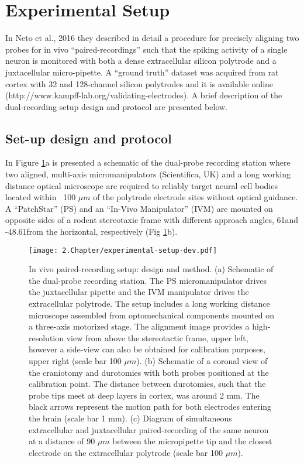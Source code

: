 
\section{Experimental Setup}
\label{sec:exp-setup}
In Neto et al., 2016 they described in detail a procedure for precisely aligning two probes for in vivo “paired-recordings” such that the spiking activity of a single neuron is monitored with both a dense extracellular silicon polytrode and a juxtacellular micro-pipette. A “ground truth” dataset was acquired from rat cortex with 32 and 128-channel silicon polytrodes and it is available online (http://www.kampff-lab.org/validating-electrodes). A brief description of the dual-recording setup design and protocol are presented below. 

\subsection{Set-up design and protocol}
\label{subsec:setup-and-protocol}
In Figure \ref{fig:experimental-aparatus}a is presented a schematic of the dual-probe recording station where two aligned, multi-axis micromanipulators (Scientifica, UK) and a long working distance optical microscope are required to reliably target neural cell bodies located within ~100 $\mu m$ of the polytrode electrode sites without optical guidance. A “PatchStar” (PS) and an “In-Vivo Manipulator” (IVM) are mounted on opposite sides of a rodent stereotaxic frame with different approach angles, 61\degree  and -48.61\degree  from the horizontal, respectively (Fig \ref{fig:experimental-aparatus}b). 

\begin{figure}[!h]
	\centering
	\texttt{[image: 2.Chapter/experimental-setup-dev.pdf]}
	\caption{In vivo paired-recording setup: design and method.
(a) Schematic of the dual-probe recording station. The PS micromanipulator drives the juxtacellular pipette and the IVM manipulator drives the extracellular polytrode. The setup includes a long working distance microscope assembled from optomechanical components mounted on a three-axis motorized stage. The alignment image provides a high-resolution view from above the stereotactic frame, upper left, however a side-view can also be obtained for calibration purposes, upper right (scale bar 100 $\mu m$).  (b) Schematic of a coronal view of the craniotomy and durotomies with both probes positioned at the calibration point. The distance between durotomies, such that the probe tips meet at deep layers in cortex, was around 2 mm. The black arrows represent the motion path for both electrodes entering the brain (scale bar 1 mm). (c) Diagram of simultaneous extracellular and juxtacellular paired-recording of the same neuron at a distance of 90 $\mu m$ between the micropipette tip and the closest electrode on the extracellular polytrode (scale bar 100 $\mu m$).}
\label{fig:experimental-aparatus}
\end{figure}

